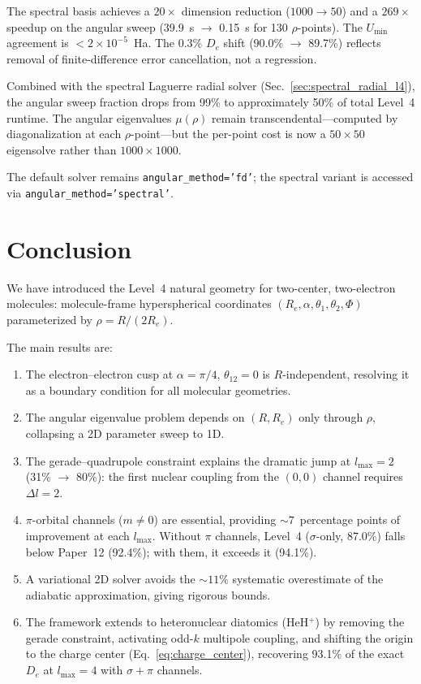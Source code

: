 \documentclass[aps,pra,twocolumn,superscriptaddress,longbibliography]{revtex4-2}
\begin{document}
The spectral basis achieves a $20\times$ dimension reduction
($1000 \to 50$) and a $269\times$ speedup on the angular sweep
(39.9~s $\to$ 0.15~s for 130 $\rho$-points).  The $U_{\min}$
agreement is $< 2 \times 10^{-5}$~Ha.  The 0.3\% $D_e$ shift
(90.0\% $\to$ 89.7\%) reflects removal of finite-difference error
cancellation, not a regression.

Combined with the spectral Laguerre radial solver
(Sec.~\ref{sec:spectral_radial_l4}), the angular sweep fraction
drops from 99\% to approximately 50\% of total Level~4 runtime.
The angular eigenvalues $\mu(\rho)$ remain transcendental---computed
by diagonalization at each $\rho$-point---but the per-point cost
is now a $50 \times 50$ eigensolve rather than
$1000 \times 1000$.

The default solver remains \texttt{angular\_method='fd'};
the spectral variant is accessed via
\texttt{angular\_method='spectral'}.

\section{Conclusion}
\label{sec:conclusion}

We have introduced the Level~4 natural geometry for two-center,
two-electron molecules: molecule-frame hyperspherical coordinates
$(R_e,\alpha,\theta_1,\theta_2,\Phi)$ parameterized by
$\rho = R/(2R_e)$.

The main results are:
\begin{enumerate}
  \item The electron--electron cusp at $\alpha = \pi/4$,
    $\theta_{12} = 0$ is $R$-independent, resolving it as a boundary
    condition for all molecular geometries.
  \item The angular eigenvalue problem depends on $(R,R_e)$ only through
    $\rho$, collapsing a 2D parameter sweep to 1D.
  \item The gerade--quadrupole constraint explains the dramatic jump at
    $l_{\max}=2$ (31\% $\to$ 80\%): the first nuclear coupling from
    the $(0,0)$ channel requires $\Delta l = 2$.
  \item $\pi$-orbital channels ($m \ne 0$) are essential, providing
    ${\sim}7$~percentage points of improvement at each $l_{\max}$.
    Without $\pi$ channels, Level~4 ($\sigma$-only, 87.0\%) falls
    below Paper~12 (92.4\%); with them, it exceeds it (94.1\%).
  \item A variational 2D solver avoids the ${\sim}11\%$ systematic
    overestimate of the adiabatic approximation, giving rigorous
    bounds.
  \item The framework extends to heteronuclear diatomics (HeH$^+$)
    by removing the gerade constraint, activating odd-$k$ multipole
    coupling, and shifting the origin to the charge center
    (Eq.~\ref{eq:charge_center}), recovering 93.1\% of the exact
    $D_e$ at $l_{\max} = 4$ with $\sigma{+}\pi$ channels.
\end{enumerate}
\end{document}
